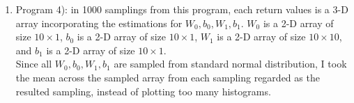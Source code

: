 \documentclass{article}
\begin{document}
\begin{enumerate}
\begin{enumerate}
\newpage
\item Program 4): in 1000 samplings from this program,  each return values is a 3-D array incorporating the estimations for $W_0, b_0, W_1, b_1$.  $W_0$ is a 2-D array of size $10\times 1$, $b_0$ is a 2-D array of size $10\times 1$, $W_1$ is a 2-D array of size $10\times 10$, and $b_1$ is a 2-D array of size $10\times 1$.\\
Since all $W_0, b_0, W_1, b_1$ are sampled from standard normal distribution,  I took the mean across the sampled array from each sampling regarded as the resulted sampling, instead of plotting too many histograms.
\begin{figure}[!htp]
	\centering
    \hfill%
	

\end{figure}
\end{enumerate}
\end{enumerate}
\end{document}

